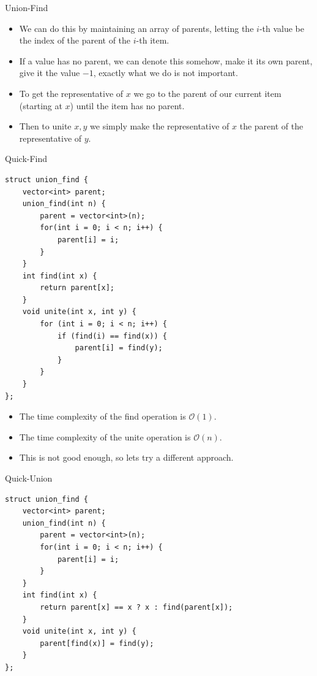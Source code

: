 \documentclass{beamer}
\begin{document}
\begin{frame}[plain]{Union-Find}
    \begin{itemize}
        \item<1-> We can do this by maintaining an array of parents, letting the $i$-th value be the index of the parent of the $i$-th item.
        \item<1-> If a value has no parent, we can denote this somehow, make it its own parent, give it the value $-1$, exactly what we do is not important.
        \item<2-> To get the representative of $x$ we go to the parent of our current item (starting at $x$) until the item has no parent.
        \item<2-> Then to unite $x, y$ we simply make the representative of $x$ the parent of the representative of $y$.
    \end{itemize}
\end{frame}

\begin{frame}{Quick-Find}
    \begin{footnotesize}
    \begin{verbatim}
struct union_find {
    vector<int> parent;
    union_find(int n) {
        parent = vector<int>(n);
        for(int i = 0; i < n; i++) {
            parent[i] = i;
        }
    }
    int find(int x) {
        return parent[x];
    }
    void unite(int x, int y) {
        for (int i = 0; i < n; i++) {
            if (find(i) == find(x)) {
                parent[i] = find(y);
            }
        }
    }
};
    \end{verbatim}
    \end{footnotesize}
\end{frame}

\begin{frame}
    \begin{itemize}
        \item The time complexity of the find operation is $\mathcal{O}(1)$.
        \item The time complexity of the unite operation is $\mathcal{O}(n)$.
        \item This is not good enough, so lets try a different approach.
    \end{itemize}
\end{frame}

\begin{frame}{Quick-Union}
    \begin{small}
    \begin{verbatim}
struct union_find {
    vector<int> parent;
    union_find(int n) {
        parent = vector<int>(n);
        for(int i = 0; i < n; i++) {
            parent[i] = i;
        }
    }
    int find(int x) {
        return parent[x] == x ? x : find(parent[x]);
    }
    void unite(int x, int y) {
        parent[find(x)] = find(y);
    }
};
    \end{verbatim}
    \end{small}
\end{frame}
\end{document}
